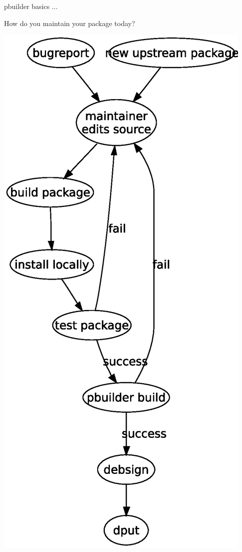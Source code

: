 \documentclass[dvipdfm,12pt]{beamer}
\begin{document}
\begin{frame}{pbuilder basics ...}
\begin{minipage}{0.4\hsize}
 How do you maintain your package today?
\end{minipage}
\begin{minipage}{0.5\hsize}
  \includegraphics[height=0.9\vsize]{develcycle.eps}
\end{minipage}
\end{frame}
\end{document}

